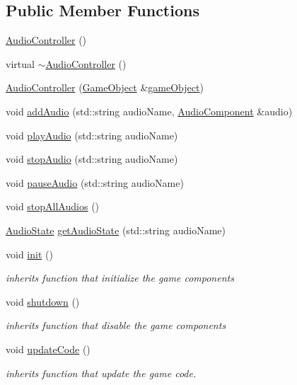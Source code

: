 \subsection*{Public Member Functions}
\begin{DoxyCompactItemize}
\item 
\hyperlink{classengine_1_1_audio_controller_ace94000a3e52f0473572395b0ef767a7}{Audio\+Controller} ()
\item 
virtual \hyperlink{classengine_1_1_audio_controller_afb803a7f9f6a450b13c73f972ecbd84d}{$\sim$\+Audio\+Controller} ()
\item 
\hyperlink{classengine_1_1_audio_controller_af8f485167b2b92c0bdd10e75b7f16e95}{Audio\+Controller} (\hyperlink{classengine_1_1_game_object}{Game\+Object} \&\hyperlink{classengine_1_1_component_ad4a4865ca4df98ebea34d04a4ec5ad07}{game\+Object})
\item 
void \hyperlink{classengine_1_1_audio_controller_a2ee4b9dd66a5ef288c22904267951dc1}{add\+Audio} (std\+::string audio\+Name, \hyperlink{classengine_1_1_audio_component}{Audio\+Component} \&audio)
\item 
void \hyperlink{classengine_1_1_audio_controller_a1c2527ac09312f27695a526d9888b420}{play\+Audio} (std\+::string audio\+Name)
\item 
void \hyperlink{classengine_1_1_audio_controller_ac065ab363d0494d376e9a50e558e52c6}{stop\+Audio} (std\+::string audio\+Name)
\item 
void \hyperlink{classengine_1_1_audio_controller_a230a285d71fbc1312b3fb4be9910182a}{pause\+Audio} (std\+::string audio\+Name)
\item 
void \hyperlink{classengine_1_1_audio_controller_a37c3410eaa94f29b465e29e72486a64d}{stop\+All\+Audios} ()
\item 
\hyperlink{namespaceengine_a5de9278ae356d4ff4fe8864ebf683bc8}{Audio\+State} \hyperlink{classengine_1_1_audio_controller_a72df19021e6d2bc8deb12ba35d7e6e8d}{get\+Audio\+State} (std\+::string audio\+Name)
\item 
void \hyperlink{classengine_1_1_audio_controller_a34af3c91cadbf4a97eafdd3e311671c9}{init} ()
\begin{DoxyCompactList}\small\item\em inherits function that initialize the game components \end{DoxyCompactList}\item 
void \hyperlink{classengine_1_1_audio_controller_aaeb8eaadaa523db5e3608f019fe1bf8e}{shutdown} ()
\begin{DoxyCompactList}\small\item\em inherits function that disable the game components \end{DoxyCompactList}\item 
void \hyperlink{classengine_1_1_audio_controller_acbbf0bd451c181fb1e3dc26e7c4be27d}{update\+Code} ()
\begin{DoxyCompactList}\small\item\em inherits function that update the game code. \end{DoxyCompactList}\end{DoxyCompactItemize}
